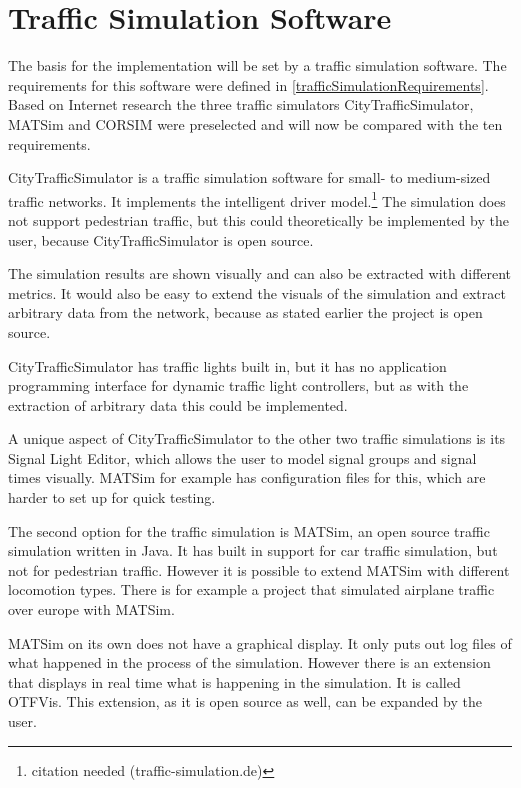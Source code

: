 \section{Traffic Simulation Software}

The basis for the implementation will be set by a traffic simulation software. The requirements for this software were defined in \ref{trafficSimulationRequirements}. Based on Internet research the three traffic simulators CityTrafficSimulator, MATSim and CORSIM were preselected and will now be compared with the ten requirements.

CityTrafficSimulator is a traffic simulation software for small- to medium-sized traffic networks. It implements the intelligent driver model.\footnote{citation needed (traffic-simulation.de)} The simulation does not support pedestrian traffic, but this could theoretically be implemented by the user, because CityTrafficSimulator is open source.

The simulation results are shown visually and can also be extracted with different metrics. It would also be easy to extend the visuals of the simulation and extract arbitrary data from the network, because as stated earlier the project is open source.

CityTrafficSimulator has traffic lights built in, but it has no application programming interface for dynamic traffic light controllers, but as with the extraction of arbitrary data this could be implemented.

A unique aspect of CityTrafficSimulator to the other two traffic simulations is its Signal Light Editor, which allows the user to model signal groups and signal times visually. MATSim for example has configuration files for this, which are harder to set up for quick testing.

The second option for the traffic simulation is MATSim, an open source traffic simulation written in Java. It has built in support for car traffic simulation, but not for pedestrian traffic. However it is possible to extend MATSim with different locomotion types. There is for example a project that simulated airplane traffic over europe with MATSim.

MATSim on its own does not have a graphical display. It only puts out log files of what happened in the process of the simulation. However there is an extension that displays in real time what is happening in the simulation. It is called OTFVis. This extension, as it is open source as well, can be expanded by the user.

